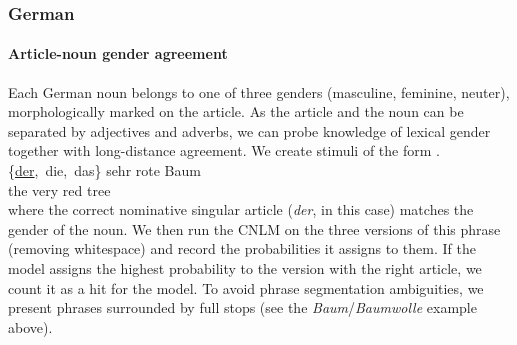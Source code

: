 \subsubsection{German}%


\paragraph{Article-noun  gender agreement}
Each German noun belongs to one of three genders (masculine, feminine, neuter), morphologically marked on the article. As the article and the noun can be separated by adjectives and adverbs, we can probe knowledge of lexical gender together with long-distance agreement.
We create stimuli of the form
\exg. \{\underline{der},\ die,\ das\} sehr rote Baum \\
the very red tree \label{ex:german-gender}\\

where the correct nominative singular article (\emph{der}, in this
case) matches the gender of the noun.  We then run the CNLM on the
three versions of this phrase (removing whitespace) and record the
probabilities it assigns to them. If the model assigns the highest
probability to the version with the right article, we count it as a
hit for the model. To avoid phrase segmentation ambiguities, we
present phrases surrounded by full stops (see the
\emph{Baum}/\emph{Baumwolle} example above).

